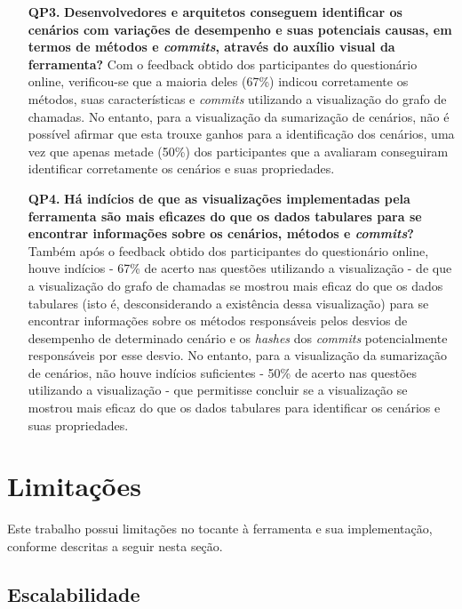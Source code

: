 \begin{itemize}
  \item[\textbf{QP3.}] \textbf{Desenvolvedores e arquitetos conseguem identificar os cenários com variações de desempenho e suas potenciais causas, em termos de métodos e \textit{commits}, através do auxílio visual da ferramenta?} Com o feedback obtido dos participantes do questionário online, verificou-se que a maioria deles (67\%) indicou corretamente os métodos, suas características e \textit{commits} utilizando a visualização do grafo de chamadas. No entanto, para a visualização da sumarização de cenários, não é possível afirmar que esta trouxe ganhos para a identificação dos cenários, uma vez que apenas metade (50\%) dos participantes que a avaliaram conseguiram identificar corretamente os cenários e suas propriedades.
  \item[\textbf{QP4.}] \textbf{Há indícios de que as visualizações implementadas pela ferramenta são mais eficazes do que os dados tabulares para se encontrar informações sobre os cenários, métodos e \textit{commits}?} Também após o feedback obtido dos participantes do questionário online, houve indícios - 67\% de acerto nas questões utilizando a visualização - de que a visualização do grafo de chamadas se mostrou mais eficaz do que os dados tabulares (isto é, desconsiderando a existência dessa visualização) para se encontrar informações sobre os métodos responsáveis pelos desvios de desempenho de determinado cenário e os \textit{hashes} dos \textit{commits} potencialmente responsáveis por esse desvio. No entanto, para a visualização da sumarização de cenários, não houve indícios suficientes - 50\% de acerto nas questões utilizando a visualização - que permitisse concluir se a visualização se mostrou mais eficaz do que os dados tabulares para identificar os cenários e suas propriedades.
\end{itemize}

\section{Limitações} \label{sec:consideracoes-limitacoes}

Este trabalho possui limitações no tocante à ferramenta e sua implementação, conforme descritas a seguir nesta seção.

\subsection{Escalabilidade} \label{subsec:consideracoes-limitacoes-escalabilidade}

